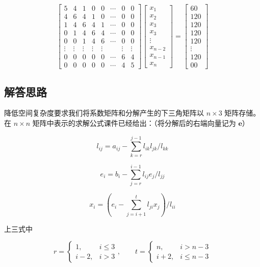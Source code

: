 \documentclass{ctexart}
\begin{document}
\[
\left[ \begin{array}{llllllll}
{5} & {4} & {1} & {0} & {0} & {\cdots} & {0} & {0} \\ 
{4} & {6} & {4} & {1} & {0} & {\cdots} & {0} & {0} \\ 
{1} & {4} & {6} & {4} & {1} & {\cdots} & {0} & {0} \\ 
{0} & {1} & {4} & {6} & {4} & {\cdots} & {0} & {0} \\ 
{0} & {0} & {1} & {4} & {6} & {\cdots} & {0} & {0} \\ 
{\vdots} & {\vdots} & {\vdots} & {\vdots} & {\vdots} & { } & {\vdots} & {\vdots} \\ 
{0} & {0} & {0} & {0} & {0} & {\cdots} & {6} & {4} \\ 
{0} & {0} & {0} & {0} & {0} & {\cdots} & {4} & {5}\end{array}\right] 
\left[ \begin{array}{c}{x_{1}} \\ {x_{2}} \\ {x_{3}} \\ {x_{3}} \\ {\vdots} \\ {x_{n-2}} \\ {x_{n-1}} \\ {x_{n}}\end{array}\right]=\left[ \begin{array}{c}{60} \\ {120} \\ {120} \\ {120} \\ {120} \\ {\vdots} \\ {120} \\ {00}\end{array}\right]
\]
\subsection{解答思路}
降低空间复杂度要求我们将系数矩阵和分解产生的下三角矩阵以 $n\times 3$ 矩阵存储。在 $n\times n$ 矩阵中表示的求解公式课件已经给出：（将分解后的右端向量记为 $\mathbf e$）

\[
l_{ij} = a_{ij} - \sum_{k=r}^{j-1}l_{ik}l_{jk}/l_{kk}
\]

\[
e_i=b_i-\sum_{j=r}^{i-1}l_{ij}e_j/l_{jj}
\]

\[
x_i=\left(e_i-\sum_{j=i+1}^tl_{ji}x_j\right)/l_{ii}
\]

上三式中

\[
r = 
\begin{cases}
1, & i \le 3\\
i-2, & i > 3
\end{cases}
, \qquad t = 
\begin{cases}
n, & i > n-3\\
i+2, & i\le n-3
\end{cases}
\]
\end{document}
